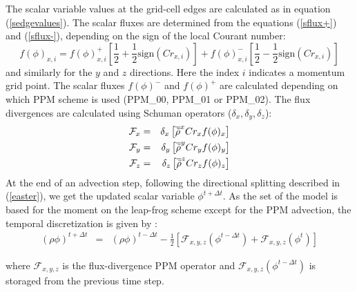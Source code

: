 The scalar variable values at the grid-cell edges are calculated as in
equation (\ref{sedgevalues}). The scalar fluxes are determined from the
equations (\ref{sflux+}) and (\ref{sflux-}), depending on the sign of the
local Courant number:
\begin{equation}
f(\phi)_{x,i} = f(\phi)^{+}_{x,i} \left [ \frac{1}{2} +
  \frac{1}{2}\mathrm{sign}(Cr_{x,i}) \right ] + 
f(\phi)^{-}_{x,i} \left [ \frac{1}{2} -
  \frac{1}{2}\mathrm{sign}(Cr_{x,i}) \right ] 
\end{equation}
and similarly for the $y$ and $z$ directions. Here the index $i$
indicates a momentum grid point. The scalar fluxes $f(\phi)^{-}$ and
$f(\phi)^{+}$ are calculated depending on which PPM scheme is used
(PPM\_00, PPM\_01 or PPM\_02). The flux divergences are calculated using
Schuman operators ($\delta_{x}, \delta_{y}, \delta_{z}$):
\begin{eqnarray}
\mathcal{F}_{x} &=& \delta_{x}\left [\overline{\tilde{\rho}}^{x} Cr_{x} f(\phi)_{x}
\right] \\
\mathcal{F}_{y} &=& \delta_{y}\left [\overline{\tilde{\rho}}^{y} Cr_{y} f(\phi)_{y}
\right] \\
\mathcal{F}_{z} &=& \delta_{z}\left [\overline{\tilde{\rho}}^{z} Cr_{z} f(\phi)_{z}
\right]
\end{eqnarray}
At the end of an advection step, following the directional splitting
described in (\ref{easter}), we get the updated scalar variable
$\phi^{t+\Delta t}$. 
As the set of the model is based for the moment on the leap-frog scheme except 
for the PPM advection, the temporal discretization is given by :
\begin{eqnarray}
   (\rho\phi)^{t+\Delta t} &=& (\rho\phi)^{t-\Delta t} - \frac{1}{2} \left [\mathcal{F}_{x,y,z}(\phi^{t-\Delta t}) + \mathcal{F}_{x,y,z}(\phi^{t}) \right ]
  \end{eqnarray}

\noindent where $\mathcal{F}_{x,y,z}$ is the flux-divergence PPM operator and $\mathcal{F}_{x,y,z}(\phi^{t-\Delta t})$ is storaged from the previous time step.


